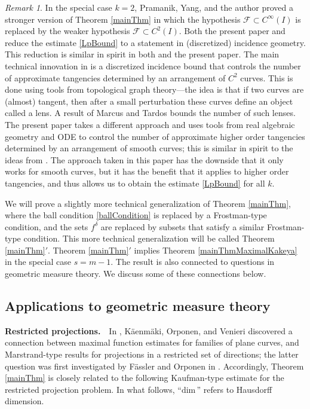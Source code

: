 \documentclass[letterpaper, reqno,11pt]{article}
\numberwithin{equation}{section}
\renewcommand{\dim}{\mathrm{dim}\,}
\numberwithin{thm}{section}
\theoremstyle{remark}
\newtheorem{rem}[thm]{Remark}
\begin{document}
\begin{rem}
In the special case $k=2$, Pramanik, Yang, and the author \cite{PYZ} proved a stronger version of Theorem \ref{mainThm} in which the hypothesis $\mathcal{F}\subset C^\infty(I)$ is replaced by the weaker hypothesis $\mathcal{F}\subset C^2(I)$. Both the present paper and \cite{PYZ} reduce the estimate \eqref{LpBound} to a statement in (discretized) incidence geometry. This reduction is similar in spirit in both \cite{PYZ} and the present paper. The main technical innovation in \cite{PYZ} is a discretized incidence bound that controls the number of approximate tangencies determined by an arrangement of $C^2$ curves. This is done using tools from topological graph theory---the idea is that if two curves are (almost) tangent, then after a small perturbation these curves define an object called a lens. A result of Marcus and Tardos \cite{MarcusTardos} bounds the number of such lenses. The present paper takes a different approach and uses tools from real algebraic geometry and ODE to control the number of approximate higher order tangencies determined by an arrangement of smooth curves; this is similar in spirit to the ideas from \cite{Zahl2020}. The approach taken in this paper has the downside that it only works for smooth curves, but it has the benefit that it applies to higher order tangencies, and thus allows us to obtain the estimate \eqref{LpBound} for all $k$.
\end{rem}

We will prove a slightly more technical generalization of Theorem \ref{mainThm}, where the ball condition \eqref{ballCondition} is replaced by a Frostman-type condition, and the sets $f^\delta$ are replaced by subsets that satisfy a similar Frostman-type condition. This more technical generalization will be called Theorem \ref{mainThm}$'$. Theorem \ref{mainThm}$'$ implies Theorem \ref{mainThmMaximalKakeya} in the special case $s=m-1$. The result is also connected to questions in geometric measure theory. We discuss some of these connections below. 
%






\subsection{Applications to geometric measure theory}
\noindent \textbf{Restricted projections.}\ \ 
In \cite{KOV2021}, K\"{a}enm\"{a}ki, Orponen, and Venieri discovered a connection between maximal function estimates for families of plane curves, and Marstrand-type results for projections in a restricted set of directions; the latter question was first investigated by F\"assler and Orponen in \cite{FasslerOrponen}. Accordingly, Theorem \ref{mainThm} is closely related to the following Kaufman-type estimate for the restricted projection problem. In what follows, ``$\dim\!$'' refers to Hausdorff dimension.
\end{document}
